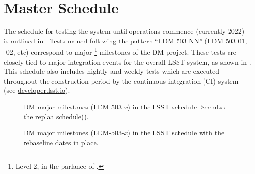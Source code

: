 \section{Master Schedule\label{sect:schedule}}

The schedule for testing the system until operations commence (currently 2022) is outlined in .
Tests named following the pattern ``LDM-503-NN'' (LDM-503-01, -02, etc) correspond to major \footnote{Level 2, in the parlance of .} milestones of the DM project.
These tests are closely tied to major integration events for the overall LSST system, as shown in .
This schedule also includes nightly and weekly tests which are executed throughout the construction period by the continuous integration (CI) system (see \url{developer.lsst.io}).



\begin{figure}[htbp]
\begin{center}

\end{center}
	\caption{DM major milestones (LDM-503-$x$) in the LSST schedule. See also the replan schedule().\label{fig:schedule}}
\end{figure}

\begin{figure}[htbp]
\begin{center}

\end{center}
\caption{DM major milestones (LDM-503-$x$) in the LSST schedule with the rebaseline dates in place.\label{fig:fschedule}}
\end{figure}

